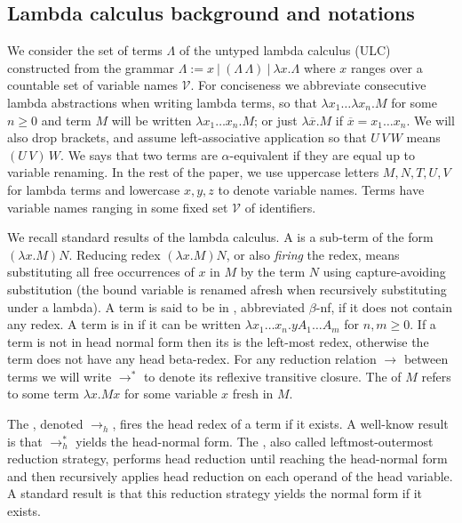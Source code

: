 \documentclass{elsarticle}
\theoremstyle{plain}
\theoremstyle{definition}
\newcommand\VarSet{\mathcal{V}}
\begin{document}
\subsection{Lambda calculus background and notations}
\label{sec:lambdacalculus_basics}

We consider the set of terms $\Lambda$ of the untyped lambda calculus (ULC) constructed from the grammar $\Lambda := x\ |\ (\Lambda\, \Lambda)\ |\ \lambda x. \Lambda $
where $x$ ranges over a countable set of variable names $\VarSet$.
For conciseness we abbreviate consecutive lambda abstractions when writing lambda terms, so that $\lambda x_1 \ldots \lambda x_n . M$ for some $n\geq 0$ and term $M$ will be written $\lambda x_1 \ldots x_n . M$; or just
$\lambda \overline{x} . M$ if $\overline{x} = x_1 \ldots x_n$.
We will also drop brackets, and assume left-associative application so that $U\,V\,W$ means $(U\,V)\,W$. We says that two terms are $\alpha$-equivalent if they are equal up to variable renaming.
In the rest of the paper, we use uppercase letters $M, N, T, U, V$ for lambda terms and lowercase $x,y,z$ to denote variable names. Terms have variable names ranging in some fixed set $\VarSet$ of identifiers.

We recall standard results of the lambda calculus.
A  is a sub-term of the form $(\lambda x. M) N$.
Reducing redex $(\lambda x. M) N$, or also \emph{firing} the redex, means substituting all free occurrences of $x$ in $M$ by the term $N$
using capture-avoiding substitution (the bound variable is renamed afresh when recursively substituting under a lambda).
A term is said to be in , abbreviated $\beta$-nf, if it does not contain any redex.
A term is in  if it can be written $\lambda x_1 \ldots x_n . y A_1 \ldots A_m$ for $n,m\geq0$. If a term is not in head normal form then its  is the left-most redex, otherwise the term does not have any head beta-redex. For any reduction relation $\rightarrow$ between terms we will write $\rightarrow^*$ to denote its reflexive transitive closure. The  of $M$ refers to some term $\lambda x. M x $ for some variable $x$ fresh in $M$.

The , denoted $\rightarrow_{h}$, fires the head redex of a term if it exists.
A well-know result is that $\rightarrow^*_{h}$ yields the head-normal form. The , also called leftmost-outermost reduction strategy, performs head reduction until reaching the head-normal form and then recursively applies head reduction on each operand of the head variable. A standard result is that this reduction strategy yields the normal form if it exists.
\end{document}
